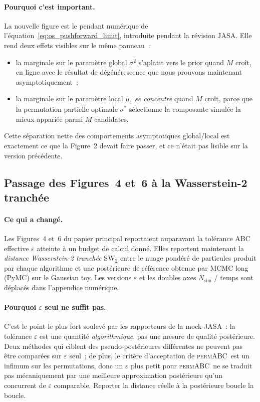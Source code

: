 \documentclass[11pt]{article}
\newcommand{\permABC}{\textsc{permABC}}
\begin{document}
\paragraph{Pourquoi c'est important.} La nouvelle figure est le pendant numérique de
l'équation~\eqref{eq:os_pushforward_limit}, introduite pendant la révision JASA. Elle rend
deux effets visibles sur le même panneau~:
\begin{itemize}[nosep]
    \item la marginale sur le paramètre global $\sigma^2$ s'aplatit vers le prior quand $M$
    croît, en ligne avec le résultat de dégénérescence que nous prouvons maintenant
    asymptotiquement~;
    \item la marginale sur le paramètre local $\mu_1$ \emph{se concentre} quand $M$ croît, parce
    que la permutation partielle optimale $\sigma^*$ sélectionne la composante simulée la mieux
    appariée parmi $M$ candidates.
\end{itemize}
Cette séparation nette des comportements asymptotiques global/local est exactement ce que la
Figure~2 devait faire passer, et ce n'était pas lisible sur la version précédente.

\subsection{Passage des Figures~4 et~6 à la Wasserstein-2 tranchée}

\paragraph{Ce qui a changé.} Les Figures~4 et~6 du papier principal reportaient auparavant la
tolérance ABC effective $\varepsilon$ atteinte à un budget de calcul donné. Elles reportent
maintenant la \emph{distance Wasserstein-2 tranchée} $\mathrm{SW}_2$ entre le nuage pondéré de
particules produit par chaque algorithme et une postérieure de référence obtenue par MCMC long
(PyMC) sur le Gaussian toy. Les versions $\varepsilon$ et les doubles axes $N_{\mathrm{sim}}$ /
temps sont déplacés dans l'appendice numérique.

\paragraph{Pourquoi $\varepsilon$ seul ne suffit pas.} C'est le point le plus fort soulevé par
les rapporteurs de la mock-JASA~: la tolérance $\varepsilon$ est une quantité
\emph{algorithmique}, pas une mesure de qualité postérieure. Deux méthodes qui ciblent des
pseudo-postérieures différentes ne peuvent pas être comparées sur $\varepsilon$ seul~; de plus,
le critère d'acceptation de \permABC\ est un infimum sur les permutations, donc un $\varepsilon$
plus petit pour \permABC\ ne se traduit pas mécaniquement par une meilleure approximation
postérieure qu'un concurrent de $\varepsilon$ comparable. Reporter la distance réelle à la
postérieure boucle la boucle.
\end{document}
